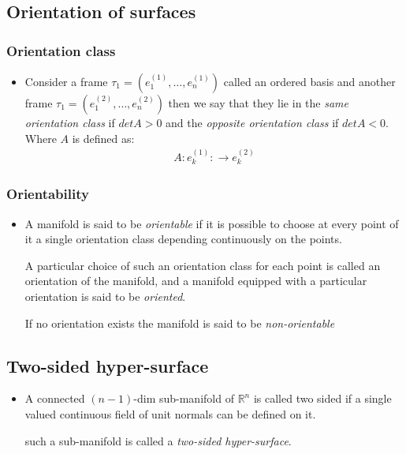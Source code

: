 \documentclass[11pt]{article}
\numberwithin{equation}{section}
\DeclareRobustCommand{\RR}{\mathbb{R}}
\begin{document}
\subsection{Orientation of surfaces }
\subsubsection{Orientation class}
\begin{itemize}
  \item Consider a frame $\tau_1 = (e_1^{(1)},\ldots,e_n^{(1)})$ called an ordered basis and another frame $\tau_1 = (e_1^{(2)},\ldots,e_n^{(2)})$ then we say that they lie in the \emph{same orientation class} if $det A>0$ and the \emph{opposite orientation class} if $det A<0$. Where $A$ is defined as:
  \begin{align*}
  A: e^{(1)}_k: \rightarrow e^{(2)}_k
  \end{align*}
\end{itemize}
\subsubsection{Orientability} 
\begin{itemize}
   \item A manifold is said to be \emph{orientable} if it is possible to choose at every point of it a single orientation class depending continuously on the points.

    A particular choice of such an orientation class for each point is called an orientation of the manifold, and a manifold equipped with a particular orientation is said to be \emph{oriented}.

    If no orientation exists the manifold is said to be \emph{non-orientable}
 \end{itemize} 

 \subsection{Two-sided hyper-surface}
 \begin{itemize}
   \item A connected $(n-1)$-dim sub-manifold of $\RR^n$ is called two sided if a single valued continuous field of unit normals can be defined on it.  

   such a sub-manifold is called a \emph{two-sided hyper-surface}. 
 \end{itemize}

\newpage
\end{document}
